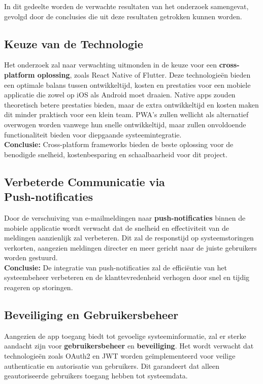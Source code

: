 \noindent In dit gedeelte worden de verwachte resultaten van het onderzoek samengevat, gevolgd door de conclusies die uit deze resultaten getrokken kunnen worden.

\subsection{Keuze van de Technologie}
\noindent Het onderzoek zal naar verwachting uitmonden in de keuze voor een \textbf{cross-platform oplossing}, zoals React Native of Flutter. Deze technologieën bieden een optimale balans tussen ontwikkeltijd, kosten en prestaties voor een mobiele applicatie die zowel op iOS als Android moet draaien. Native apps zouden theoretisch betere prestaties bieden, maar de extra ontwikkeltijd en kosten maken dit minder praktisch voor een klein team. PWA's zullen wellicht als alternatief overwogen worden vanwege hun snelle ontwikkeltijd, maar zullen onvoldoende functionaliteit bieden voor diepgaande systeemintegratie. \\


\noindent \textbf{Conclusie:} Cross-platform frameworks bieden de beste oplossing voor de benodigde snelheid, kostenbesparing en schaalbaarheid voor dit project.

\subsection{Verbeterde Communicatie via \\Push-notificaties}
\noindent Door de verschuiving van e-mailmeldingen naar \textbf{push-notificaties} binnen de mobiele applicatie wordt verwacht dat de snelheid en effectiviteit van de meldingen aanzienlijk zal verbeteren. Dit zal de responstijd op systeemstoringen verkorten, aangezien meldingen directer en meer gericht naar de juiste gebruikers worden gestuurd.\\


\noindent \textbf{Conclusie:} De integratie van push-notificaties zal de efficiëntie van het systeembeheer verbeteren en de klanttevredenheid verhogen door snel en tijdig reageren op storingen.

\subsection{Beveiliging en Gebruikersbeheer}
\noindent Aangezien de app toegang biedt tot gevoelige systeeminformatie, zal er sterke aandacht zijn voor \textbf{gebruikersbeheer} en \textbf{beveiliging}. Het wordt verwacht dat technologieën zoals OAuth2 en JWT worden geïmplementeerd voor veilige authenticatie en autorisatie van gebruikers. Dit garandeert dat alleen geautoriseerde gebruikers toegang hebben tot systeemdata.\\


